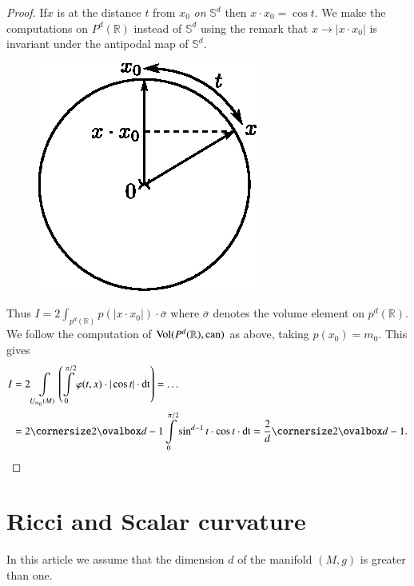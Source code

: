 \begin{proof}
If\pageoriginale $x$ is at the distance $t$ from $x_{0}$ {\em on}
$\mathbb{S}^{d}$ then $x\cdot x_{0}=\cos t$. We make the computations
on $P^{d}(\mathbb{R})$ instead of $\mathbb{S}^{d}$ using the remark
that $x\to |x\cdot x_{0}|$ is invariant under the antipodal map of
$\mathbb{S}^{d}$. 
\begin{figure}[H]
\centering
\includegraphics[scale=1.1]{figures/chap6-fig1.eps}
\end{figure}
Thus $I=2\int_{p^{d}(\mathbb{R})}p(|x\cdot
x_{0}|)\cdot\overline{\sigma}$ where $\overline{\sigma}$ denotes the
volume element on $p^{d}(\mathbb{R})$. We follow the computation of
$\operatorname{Vol}(P^{d}(\mathbb{R}),\operatorname{can})$ as above, taking $p(x_{0})=m_{0}$. This
gives
\begin{align*}
I &=
2\int\limits_{U_{m_{0}}(M)}\left(\int\limits^{\pi/2}_{0}\varphi(t,x)\cdot
|\cos t|\cdot \dt\right)=\ldots\\
&= 2\oval{d-1}\int\limits^{\pi/2}_{0}\sin^{d-1}t\cdot \cos t\cdot
\dt=\frac{2}{d}\oval{d-1}. 
\end{align*}
\end{proof}

\section{Ricci and Scalar curvature}\label{chap6:sec8}

\quad
In this article we assume that the dimension $d$ of the manifold
$(M,g)$ is greater than one.

